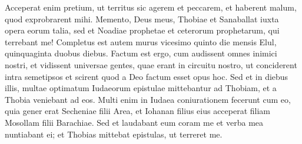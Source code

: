 \begin{biblechapter}
\begin{biblechapter}
\begin{biblechapter}
\begin{biblechapter}
\begin{biblechapter}
\begin{biblechapter}
\verse Acceperat enim pretium, ut territus sic agerem et peccarem, et haberent malum, quod exprobrarent mihi. 
\verse Memento, Deus meus, Thobiae et Sanaballat iuxta opera eorum talia, sed et Noadiae prophetae et ceterorum prophetarum, qui terrebant me!
 \verse Completus est autem murus vicesimo quinto die mensis Elul, quinquaginta duobus diebus. 
\verse Factum est ergo, cum audissent omnes inimici nostri, et vidissent universae gentes, quae erant in circuitu nostro, ut conciderent intra semetipsos et scirent quod a Deo factum esset opus hoc.
 \verse Sed et in diebus illis, multae optimatum Iudaeorum epistulae mittebantur ad Thobiam, et a Thobia veniebant ad eos. 
\verse Multi enim in Iudaea coniurationem fecerunt cum eo, quia gener erat Secheniae filii Area, et Iohanan filius eius acceperat filiam Mosollam filii Barachiae. 
\verse Sed et laudabant eum coram me et verba mea nuntiabant ei; et Thobias mittebat epistulas, ut terreret me.
 

\end{biblechapter}
\end{biblechapter}
\end{biblechapter}
\end{biblechapter}
\end{biblechapter}
\end{biblechapter}

